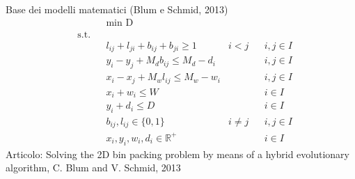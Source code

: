 \documentclass{beamer}
\begin{document}
\begin{frame}{Base dei modelli matematici \scriptsize{(Blum e Schmid, 2013)}}
	\begin{align*}
		& & &\underset{}{\text{min D}} \\
		& \text{s.t.} \\
		  &   &   & l_{ij} + l_{ji} + b_{ij} + b_{ji} \geq 1      & i < j    &   & i,j \in I \\
		  &   &   & y_i - y_j + M_d b_{ij} \leq M_d - d_i         &          &   & i,j \in I \\
		  &   &   & x_i - x_j + M_w l_{ij} \leq M_w - w_i         &          &   & i,j \in I \\
		  &   &   & x_i + w_i \leq W                              &          &   & i \in I   \\
		  &   &   & y_i + d_i \leq D                              &          &   & i \in I   \\
		  &   &   & b_{ij}, l_{ij} \in \{0,1\}                    & i \neq j &   & i,j \in I \\
		  &   &   & x_{i}, y_{i}, w_{i}, d_{i} \in \mathbb{R}^{+} &          &   & i \in I   
	\end{align*}
	\scriptsize{Articolo: Solving the 2D bin packing problem by means of a hybrid evolutionary algorithm, C. Blum and V. Schmid, 2013}
\end{frame}
\end{document}
